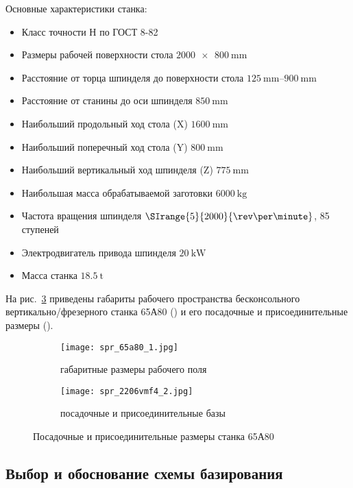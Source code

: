 \documentclass[14pt,russian,a4paper]{extreport}
\begin{document}
Основные характеристики станка:
\begin{itemize}
	\item Класс точности Н по ГОСТ 8-82
	\item Размеры рабочей поверхности стола $\SI{2000 x 800}{\milli\meter}$
	\item Расстояние от торца шпинделя до поверхности стола $\SIrange{125}{900}{\milli\meter}$
	\item Расстояние от станины до оси шпинделя $\SI{850}{\milli\meter}$
	\item Наибольший продольный ход стола (X) $\SI{1600}{\milli\meter}$
	\item Наибольший поперечный ход стола (Y) $\SI{800}{\milli\meter}$
	\item Наибольший вертикальный ход шпинделя (Z) $\SI{775}{\milli\meter}$
	\item Наибольшая масса обрабатываемой заготовки $\SI{6000}{\kilo\gram}$
	\item Частота вращения шпинделя $\SIrange{5}{2000}{\rev\per\minute}$, 85 ступеней
	\item Электродвигатель привода шпинделя $\SI{20}{\kilo\watt}$
	\item Масса станка $\SI{18,5}{\tonne}$
\end{itemize}
 
На рис.~\ref{fig:65a80} приведены габариты рабочего пространства бесконсольного вертикально\-/фрезерного станка 65А80 () и его посадочные и присоединительные размеры ().

\begin{figure}[H]
	\centering
  \begin{subfigure}[b]{.50\textwidth}
    \centering
    \texttt{[image: spr\_65a80\_1.jpg]}
    \caption{габаритные размеры рабочего поля}
    \label{subfig:65a80a}
  \end{subfigure}%
  \begin{subfigure}[b]{.50\textwidth}
    \centering
    \texttt{[image: spr\_2206vmf4\_2.jpg]}
    \caption{посадочные и присоединительные базы}
    \label{subfig:65a80b}
  \end{subfigure}%
  \caption{Посадочные и присоединительные размеры станка 65А80}
  \label{fig:65a80}
\end{figure}

\newpage
\subsection{Выбор и обоснование схемы базирования}
\end{document}
